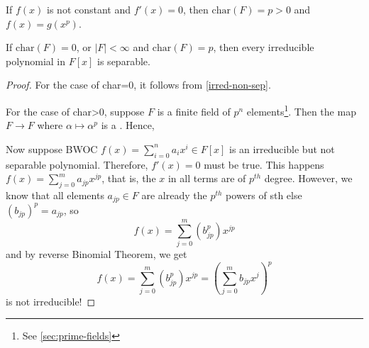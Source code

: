 \documentclass[12pt]{article}
\begin{document}

If $f(x)$ is not constant and $f'(x)=0$, then $\mathrm{char} (F)=p>0$ and $f(x)=g(x^p)$.

\begin{proposition}
    If $\mathrm{char}(F)=0$, or $|F|<\infty$ and $\mathrm{char}(F)=p $, then every irreducible polynomial in $F[x]$ is separable.
\end{proposition}
\begin{proof}
    For the case of char=0, it follows from \ref{irred-non-sep}.

    For the case of char>0, suppose $F$ is a finite field of $p^n$ elements\footnote{See \cref{sec:prime-fields}}. Then the map $F\to F$ where $\alpha\mapsto \alpha^p$ is a . Hence, 

    Now suppose BWOC $f(x)=\sum_{i=0}^{n}a_ix^i\in F[x]$ is an irreducible but not separable polynomial. Therefore, $f'(x)=0$ must be true. This happens \ifnif $f(x)=\sum_{j=0}^{m}a_{jp}x^{jp}$, that is, the $x$ in all terms are of $p^{th}$ degree. However, we know that all elements $a_{jp}\in F$ are already the $p^{th}$ powers of sth else $(b_{jp})^p=a_{jp}$, so $$f(x)=\sum_{j=0}^{m}(b_{jp}^p)x^{jp}$$ and by reverse Binomial Theorem, we get $$f(x)=\sum_{j=0}^{m}(b_{jp}^p)x^{jp}=\left(\sum_{j=0}^{m}b_{jp}x^j\right)^p$$ is not irreducible!
\end{proof}
\end{document}
